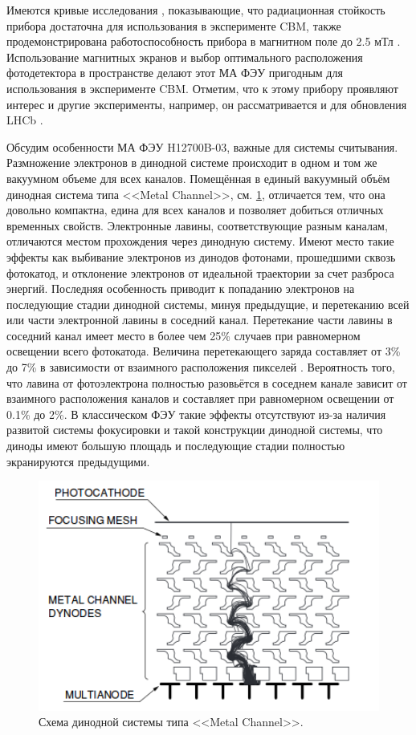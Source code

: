 Имеются кривые  исследования \cite{}, показывающие, что радиационная стойкость прибора достаточна для использования в эксперименте CBM, также продемонстрирована работоспособность прибора в магнитном поле до 2.5 мТл \cite{}. Использование магнитных экранов и выбор оптимального расположения фотодетектора в пространстве делают этот МА ФЭУ пригодным для использования в эксперименте CBM. Отметим, что к этому прибору проявляют интерес и другие эксперименты, например, он рассматривается и для обновления LHCb \cite{}.

Обсудим особенности МА ФЭУ H12700B-03, важные для системы считывания. Размножение электронов в динодной системе происходит в одном и том же вакуумном объеме для всех каналов. Помещённая в единый вакуумный объём динодная система типа <<Metal Channel>>, см. \ref{fig:MetalChannel}, отличается тем, что она довольно компактна, едина для всех каналов и позволяет добиться отличных временных свойств. Электронные лавины, соответствующие разным каналам, отличаются местом прохождения через динодную систему. Имеют место такие эффекты как выбивание электронов из динодов фотонами, прошедшими сквозь фотокатод, и отклонение электронов от идеальной траектории за счет разброса энергий. Последняя особенность приводит к попаданию электронов на последующие стадии динодной системы, минуя предыдущие, и перетеканию всей или части электронной лавины в соседний канал. Перетекание части лавины в соседний канал имеет место в более чем 25\% случаев при равномерном освещении всего фотокатода. Величина перетекающего заряда составляет от 3\% до 7\% в зависимости от взаимного расположения пикселей \cite{}. Вероятность того, что лавина от фотоэлектрона полностью разовьётся в соседнем канале зависит от взаимного расположения каналов и составляет при равномерном освещении от 0.1\% до 2\%. В классическом ФЭУ такие эффекты отсутствуют из-за наличия развитой системы фокусировки и такой конструкции динодной системы, что диноды имеют большую площадь и последующие стадии полностью экранируются предыдущими.

\begin{figure}
\includegraphics[width=1.0\textwidth]{pictures/2_Metal_channel.png}
\caption{Схема динодной системы типа <<Metal Channel>>.}
\label{fig:MetalChannel}
\end{figure}

